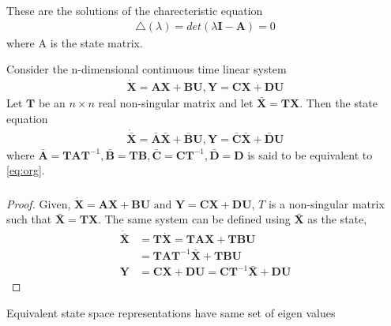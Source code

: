 \documentclass{beamer}
\renewcommand{\vec}[1]{\mathbf{#1}}
\begin{document}
\begin{frame}
\frametitle{}
\begin{definition} 
These are the solutions of the charecteristic equation
\begin{align}
    \triangle(\lambda)=det(\lambda \vec{I}-\vec{A})=0
\end{align}
where A is the state matrix. 
\end{definition}
\begin{theorem}
Consider the n-dimensional continuous time linear system
\begin{align}
    \vec{\dot X}=\vec{A}\vec{X}+\vec{B}\vec{U}, \vec{Y}=\vec{C}\vec{X}+\vec{D}\vec{U}
    \label{eq:org}
\end{align}
Let $\vec{T}$ be an $n\times n$ real non-singular matrix and let $\vec{\bar X}= \vec{T}\vec{X}$. Then the state equation 
\begin{align}
    \vec{\dot{\bar X}}=\vec{\bar A}\vec{\bar X}+ \vec{\bar B}\vec{U}, \vec{Y}=\vec{\bar C}\vec{\bar X}+\vec{\bar D}\vec{U}
    \label{eq:new}
\end{align}
where $\vec{\bar A}=\vec{T}\vec{A}\vec{T}^{-1}, \vec{\bar B}=\vec{T}\vec{B}, \vec{\bar C}=\vec{C}\vec{T}^{-1}, \vec{\bar D}=\vec{D}$ is said to be equivalent to \eqref{eq:org}.
\label{eq:th1}
\end{theorem}
\end{frame}

\begin{frame}
\frametitle{}
\begin{proof}
Given, $\vec{\dot X}=\vec{A}\vec{X}+\vec{B}\vec{U} \text{ and } \vec{Y}=\vec{C}\vec{X}+\vec{D}\vec{U}$, $T$ is a non-singular matrix such that $\vec{\bar X}= \vec{T}\vec{X}$. The same system can be defined using $\vec{\bar X}$ as the state,
\begin{align}
    \vec{\dot{\bar X}}&=\vec{T}\vec{\dot X}=\vec{T}\vec{A}\vec{X}+\vec{T}\vec{B}\vec{U}\\
    &=\vec{T}\vec{A}\vec{T}^{-1}\vec{\bar X}+\vec{T}\vec{B}\vec{U}\\
    \vec{Y}&=\vec{C}\vec{X}+\vec{D}\vec{U}=\vec{C}\vec{T}^{-1}\vec{\bar X}+\vec{D}\vec{U}
\end{align}
\end{proof}
\begin{theorem}
Equivalent state space representations have same set of eigen values
\label{eq:th2}
\end{theorem}
\end{frame}
\end{document}

